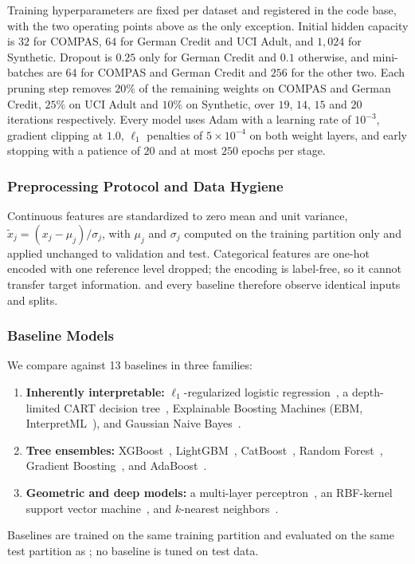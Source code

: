 Training hyperparameters are fixed per dataset and registered in the code base,
with the two operating points above as the only exception. Initial hidden
capacity is $32$ for COMPAS, $64$ for German Credit and UCI Adult, and
$1{,}024$ for Synthetic. Dropout is $0.25$ only for German Credit and $0.1$
otherwise, and mini-batches are $64$ for COMPAS and German Credit and $256$ for
the other two. Each pruning step removes $20\%$ of the remaining weights on
COMPAS and German Credit, $25\%$ on UCI Adult and $10\%$ on Synthetic, over $19$,
$14$, $15$ and $20$ iterations respectively. Every model uses Adam with a
learning rate of $10^{-3}$, gradient clipping at $1.0$, $\ell_1$ penalties of
$5\times10^{-4}$ on both weight layers, and early stopping with a patience of
$20$ and at most $250$ epochs per stage.

\subsubsection{Preprocessing Protocol and Data Hygiene}
Continuous features are standardized to zero mean and unit variance,
$\tilde{x}_j = (x_j - \mu_j)/\sigma_j$, with $\mu_j$ and $\sigma_j$ computed on
the training partition only and applied unchanged to validation and test.
Categorical features are one-hot encoded with one reference level dropped; the
encoding is label-free, so it cannot transfer target information. \modelname{}
and every baseline therefore observe identical inputs and splits.

\subsubsection{Baseline Models}
We compare against 13 baselines in three families:
\begin{enumerate}
    \item \textbf{Inherently interpretable:} $\ell_1$-regularized logistic
    regression~\cite{hosmer2000applied,tibshirani1996lasso}, a depth-limited CART decision
    tree~\cite{breiman1984classification}, Explainable Boosting Machines (EBM,
    InterpretML~\cite{caruana2015intelligible,lou2012intelligible}), and Gaussian
    Naive Bayes~\cite{hand2001idiot}.
    \item \textbf{Tree ensembles:} XGBoost~\cite{chen2016xgboost},
    LightGBM~\cite{ke2017lightgbm}, CatBoost~\cite{prokhorenkova2018catboost},
    Random Forest~\cite{breiman2001random}, Gradient
    Boosting~\cite{friedman2001greedy}, and AdaBoost~\cite{freund1997decision}.
    \item \textbf{Geometric and deep models:} a multi-layer
    perceptron~\cite{rumelhart1986learning,goodfellow2016deep}, an RBF-kernel support vector
    machine~\cite{cortes1995support}, and $k$-nearest
    neighbors~\cite{cover1967nearest}.
\end{enumerate}
Baselines are trained on the same training partition and evaluated on the same
test partition as \modelname{}; no baseline is tuned on test data.

